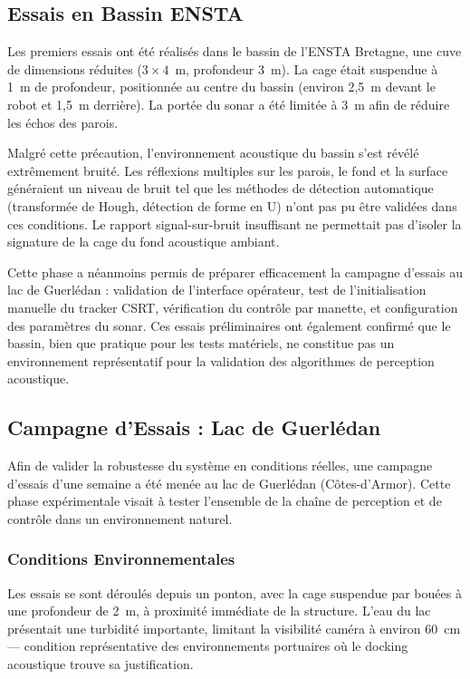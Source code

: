 \subsection{Essais en Bassin ENSTA}

Les premiers essais ont été réalisés dans le bassin de l'ENSTA Bretagne, une cuve de dimensions réduites ($3 \times 4$~m, profondeur 3~m). La cage était suspendue à 1~m de profondeur, positionnée au centre du bassin (environ 2,5~m devant le robot et 1,5~m derrière). La portée du sonar a été limitée à 3~m afin de réduire les échos des parois.

Malgré cette précaution, l'environnement acoustique du bassin s'est révélé extrêmement bruité. Les réflexions multiples sur les parois, le fond et la surface généraient un niveau de bruit tel que les méthodes de détection automatique (transformée de Hough, détection de forme en U) n'ont pas pu être validées dans ces conditions. Le rapport signal-sur-bruit insuffisant ne permettait pas d'isoler la signature de la cage du fond acoustique ambiant.

Cette phase a néanmoins permis de préparer efficacement la campagne d'essais au lac de Guerlédan : validation de l'interface opérateur, test de l'initialisation manuelle du tracker CSRT, vérification du contrôle par manette, et configuration des paramètres du sonar. Ces essais préliminaires ont également confirmé que le bassin, bien que pratique pour les tests matériels, ne constitue pas un environnement représentatif pour la validation des algorithmes de perception acoustique.

\subsection{Campagne d'Essais : Lac de Guerlédan}

Afin de valider la robustesse du système en conditions réelles, une campagne d'essais d'une semaine a été menée au lac de Guerlédan (Côtes-d'Armor). Cette phase expérimentale visait à tester l'ensemble de la chaîne de perception et de contrôle dans un environnement naturel.

\subsubsection*{Conditions Environnementales}

Les essais se sont déroulés depuis un ponton, avec la cage suspendue par bouées à une profondeur de 2~m, à proximité immédiate de la structure. L'eau du lac présentait une turbidité importante, limitant la visibilité caméra à environ 60~cm --- condition représentative des environnements portuaires où le docking acoustique trouve sa justification.

